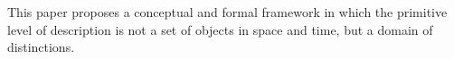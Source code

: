 This paper proposes a conceptual and formal framework in which the primitive level of
description is not a set of objects in space and time, but a domain of distinctions.
